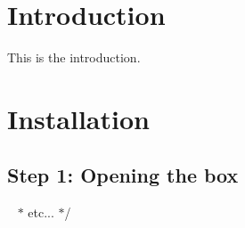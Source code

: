 
\begin{DoxyItemize}
\item 
\item 
\end{DoxyItemize}\hypertarget{index_intro_sec}{}\section{Introduction}\label{index_intro_sec}

\begin{DoxyItemize}
\item 
\item This is the introduction.
\item 
\item 
\end{DoxyItemize}\hypertarget{index_install_sec}{}\section{Installation}\label{index_install_sec}

\begin{DoxyItemize}
\item 
\item 
\end{DoxyItemize}\hypertarget{index_step1}{}\subsection{Step 1\+: Opening the box}\label{index_step1}

\begin{DoxyItemize}
\item ~\newline
 $\ast$ etc... $\ast$/ 
\end{DoxyItemize}